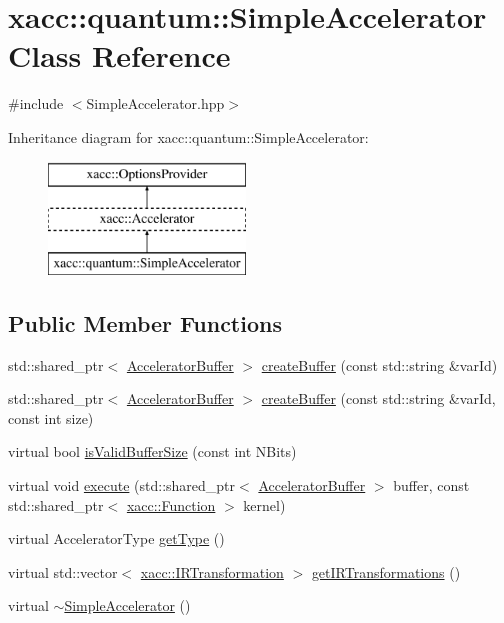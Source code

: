 \hypertarget{a01244}{}\section{xacc\+:\+:quantum\+:\+:Simple\+Accelerator Class Reference}
\label{a01244}


{\ttfamily \#include $<$Simple\+Accelerator.\+hpp$>$}

Inheritance diagram for xacc\+:\+:quantum\+:\+:Simple\+Accelerator\+:\begin{figure}[H]
\begin{center}
\leavevmode
\includegraphics[height=3.000000cm]{a01244}
\end{center}
\end{figure}
\subsection*{Public Member Functions}
\begin{DoxyCompactItemize}
\item 
std\+::shared\+\_\+ptr$<$ \hyperlink{a02444}{Accelerator\+Buffer} $>$ \hyperlink{a01244_a46445d77d4b8ad2689571d0db6604380}{create\+Buffer} (const std\+::string \&var\+Id)
\item 
std\+::shared\+\_\+ptr$<$ \hyperlink{a02444}{Accelerator\+Buffer} $>$ \hyperlink{a01244_adb9393692e9f484df241aa5d014030d1}{create\+Buffer} (const std\+::string \&var\+Id, const int size)
\item 
virtual bool \hyperlink{a01244_a60b9db2d6aed235857c45413a070338e}{is\+Valid\+Buffer\+Size} (const int N\+Bits)
\item 
virtual void \hyperlink{a01244_a3089b15fbbaa83abf2941bd3b8d2d3c6}{execute} (std\+::shared\+\_\+ptr$<$ \hyperlink{a02444}{Accelerator\+Buffer} $>$ buffer, const std\+::shared\+\_\+ptr$<$ \hyperlink{a02456}{xacc\+::\+Function} $>$ kernel)
\item 
virtual Accelerator\+Type \hyperlink{a01244_ad76eeb0bbd7de21aad5bd20d20970a98}{get\+Type} ()
\item 
virtual std\+::vector$<$ \hyperlink{a02484}{xacc\+::\+I\+R\+Transformation} $>$ \hyperlink{a01244_afc49c9e7973ba6c6ff9761c36198323d}{get\+I\+R\+Transformations} ()
\item 
virtual \hyperlink{a01244_a7ff286def924fafdff2066d12858e60c}{$\sim$\+Simple\+Accelerator} ()
\end{DoxyCompactItemize}
